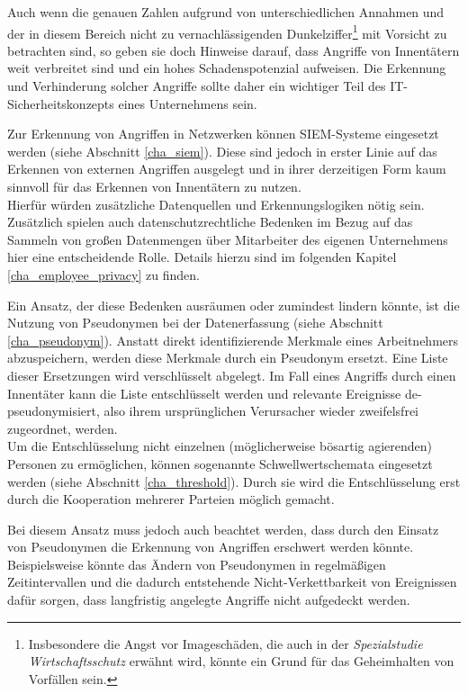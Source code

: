 
Auch wenn die genauen Zahlen aufgrund von unterschiedlichen Annahmen und der in diesem Bereich nicht zu vernachlässigenden Dunkelziffer\footnote{
	Insbesondere die Angst vor Imageschäden, die auch in der \textit{Spezialstudie Wirtschaftsschutz} erwähnt wird, könnte ein Grund für das Geheimhalten von Vorfällen sein.
} mit Vorsicht zu betrachten sind, so geben sie doch Hinweise darauf, dass Angriffe von Innentätern weit verbreitet sind und ein hohes Schadenspotenzial aufweisen. Die Erkennung und Verhinderung solcher Angriffe sollte daher ein wichtiger Teil des IT-Sicherheitskonzepts eines Unternehmens sein.

Zur Erkennung von Angriffen in Netzwerken können SIEM-Systeme eingesetzt werden (siehe Abschnitt \ref{cha_siem}). Diese sind jedoch in erster Linie auf das Erkennen von externen Angriffen ausgelegt und in ihrer derzeitigen Form kaum sinnvoll für das Erkennen von Innentätern zu nutzen.  \\
Hierfür würden zusätzliche Datenquellen und Erkennungslogiken nötig sein. 
Zusätzlich spielen auch  datenschutzrechtliche Bedenken im Bezug auf das Sammeln von großen Datenmengen über Mitarbeiter des eigenen Unternehmens hier eine entscheidende Rolle. Details hierzu sind im folgenden Kapitel \ref{cha_employee_privacy} zu finden.

Ein Ansatz, der diese Bedenken ausräumen oder zumindest lindern könnte, ist die Nutzung von Pseudonymen bei der Datenerfassung (siehe Abschnitt \ref{cha_pseudonym}). Anstatt direkt identifizierende Merkmale eines Arbeitnehmers abzuspeichern, werden diese Merkmale durch ein Pseudonym ersetzt. Eine Liste dieser Ersetzungen wird verschlüsselt abgelegt. Im Fall eines Angriffs durch einen Innentäter kann die Liste entschlüsselt werden und relevante Ereignisse de-pseudonymisiert, also ihrem ursprünglichen Verursacher wieder zweifelsfrei zugeordnet, werden.\\
Um die Entschlüsselung nicht einzelnen (möglicherweise bösartig agierenden) Personen zu ermöglichen, können sogenannte Schwellwertschemata eingesetzt werden (siehe Abschnitt \ref{cha_threshold}). Durch sie wird die Entschlüsselung erst durch die Kooperation mehrerer Parteien möglich gemacht.

Bei diesem Ansatz muss jedoch auch beachtet werden, dass durch den Einsatz von Pseudonymen die Erkennung von Angriffen erschwert werden könnte. Beispielsweise könnte das Ändern von Pseudonymen in regelmäßigen Zeitintervallen und die dadurch entstehende Nicht-Verkettbarkeit von Ereignissen dafür sorgen, dass langfristig angelegte Angriffe nicht aufgedeckt werden.

